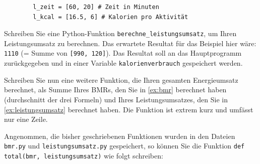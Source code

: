 \begin{myexercise}
	\begin{lstlisting}
		l_zeit = [60, 20] # Zeit in Minuten
		l_kcal = [16.5, 6] # Kalorien pro Aktivität
	\end{lstlisting}
	Schreiben Sie eine Python-Funktion \lstinline|berechne_leistungsumsatz|, um Ihren Leistungsumsatz zu berechnen. Das erwartete Resultat für das Beispiel hier wäre: \lstinline|1110| (= Summe von \lstinline|[990, 120]|). Das Resultat soll an das Hauptprogramm zurückgegeben und in einer Variable \texttt{kalorienverbrauch} gespeichert werden.
	\begin{myanswer}
		
	\end{myanswer}

\end{myexercise}

\begin{myexercise}
	Schreiben Sie nun eine weitere Funktion, die Ihren gesamten Energieumsatz berechnet, als Summe Ihres BMRs, den Sie in \cref{ex:bmr} berechnet haben (durchschnitt der drei Formeln) und Ihres Leistungsumsatzes, den Sie in \cref{ex:leistungsumsatz} berechnet haben. Die Funktion ist extrem kurz und umfässt nur eine Zeile.
	\begin{myanswer}
		Angenommen, die bisher geschriebenen Funktionen wurden in den Dateien \texttt{bmr.py} und \texttt{leistungsumsatz.py} gespeichert, so können Sie die Funktion \lstinline|def total(bmr, leistungsumsatz)| wie folgt schreiben:
		
	\end{myanswer}
\end{myexercise}




